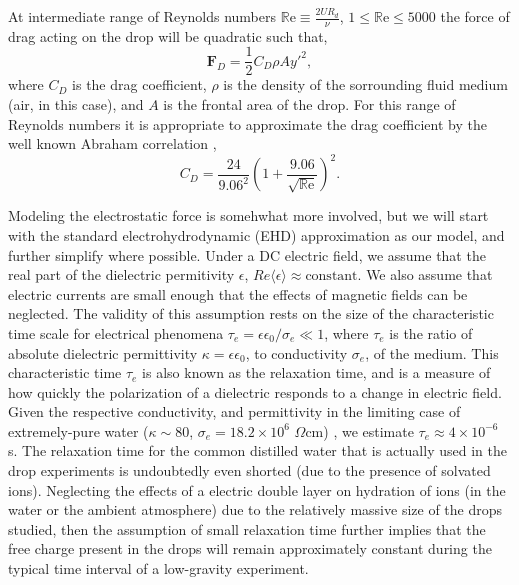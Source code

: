 \documentclass[12pt,a4paper,oneside]{book}
\begin{document}
At intermediate range of Reynolds numbers $\mathbb{R}\mbox{e} \equiv \frac{2UR_d}{\nu}$, $1 \leq \mathbb{R}\mbox{e} \leq 5000 $ the force of drag acting on the drop will be quadratic such that,
\begin{equation*}\label{drag_force}
\mathbf{F}_D = \frac{1}{2}C_D \rho A {y'}^2,
\end{equation*}
where $C_D$ is the drag coefficient, $\rho$ is the density of the sorrounding fluid medium (air, in this case), and $A$ is the frontal area of the drop. For this range of Reynolds numbers it is appropriate to approximate the drag coefficient by the well known Abraham correlation \cite{abraham_functional_1970},
\[C_D = \frac{24}{9.06^2} \left( 1 + \frac{9.06}{\sqrt{\mathbb{R}\mbox{e}}} \right)^2 .\]

Modeling the electrostatic force is somehwhat more involved, but we will start with the standard electrohydrodynamic (EHD) approximation \cite{saville_electrohydrodynamics:taylor-melcher_1997} as our model, and further simplify where possible. Under a DC electric field, we assume that the real part of the dielectric permitivity $\epsilon$, $Re \langle \epsilon \rangle \approx  \mbox{constant}$. We also assume that electric currents are small enough that the effects of magnetic fields can be neglected. The validity of this assumption rests on the size of the characteristic time scale for electrical phenomena $\tau_e = \epsilon \epsilon_0/\sigma_e \ll 1$, where $\tau_e$ is the ratio of absolute dielectric permittivity $\kappa = \epsilon \epsilon_0$, to conductivity $\sigma_e$, of the medium. This characteristic time $\tau_e$ is also known as the relaxation time, and is a measure of how quickly the polarization of a dielectric responds to a change in electric field. Given the respective conductivity, and permittivity in the limiting case of extremely-pure water ($ \kappa \sim 80$, $\sigma_e = 18.2 \times 10^{6}$ $\Omega\mbox{cm}$) \cite{yatsuzuka_electrification_1994}, we estimate $\tau_e \approx 4 \times 10^{-6}$ s. The relaxation time for the common distilled water that is actually used in the drop experiments is undoubtedly even shorted (due to the presence of solvated ions). Neglecting the effects of a electric double layer on hydration of ions (in the water or the ambient atmosphere) due to the relatively massive size of the drops studied, then the assumption of small relaxation time further implies that the free charge present in the drops will remain approximately constant during the typical time interval of a low-gravity experiment.
\end{document}
